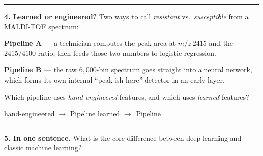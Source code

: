 \documentclass[11pt]{article}
\newif\ifsolution
\newcommand{\blk}[1]{\underline{\hspace{#1}}}
\newcommand{\rb}[2]{\ifsolution\textbf{#1}\else\blk{#2}\fi}
\newcommand{\keybox}[1]{\ifsolution\par\vspace{2pt}%
  \fbox{\parbox{0.965\textwidth}{\small\textbf{Answer.}\; #1}}\par\fi}
\newcommand{\work}[1]{\ifsolution\else\vspace{#1}\fi}
\begin{document}
\work{0.7cm}

\keybox{Row 1: $(1)(2)+(0)(1)+(2)(0) = 2$. \ Row 2: $(-1)(2)+(3)(1)+(1)(0) = 1$. \ Hence
$\mathbf{W}\mathbf{x} = \left(\begin{smallmatrix}2\\1\end{smallmatrix}\right)$. A $2\times3$
matrix times a length-$3$ vector yields a length-$2$ output --- one number per neuron: a full
forward pass.}

\vspace{2pt}\hrule\vspace{5pt}

\textbf{4. Learned or engineered?}\; {\small Two ways to call \emph{resistant} vs.\
\emph{susceptible} from a MALDI-TOF spectrum:}

\vspace{2pt}
\textbf{Pipeline A} --- a technician computes the peak area at $m/z\ 2415$ and the $2415/4100$
ratio, then feeds those two numbers to logistic regression.

\textbf{Pipeline B} --- the raw $6{,}000$-bin spectrum goes straight into a neural network,
which forms its own internal ``peak-ish here'' detector in an early layer.

\vspace{3pt}
Which pipeline uses \emph{hand-engineered} features, and which uses \emph{learned} features?

\vspace{3pt}
hand-engineered $\rightarrow$ Pipeline \rb{A}{1.6cm}
\hfill
learned $\rightarrow$ Pipeline \rb{B}{1.6cm}
\hspace*{2cm}

\keybox{Hand-engineered $\rightarrow$ A; learned $\rightarrow$ B. In A a human chose the peak
area and the ratio (hand-engineered features); in B the network discovers its own ``peak-ish''
detector directly from the raw spectrum (learned features). That shift is the essence of deep
learning.}

\vspace{2pt}\hrule\vspace{5pt}

\textbf{5. In one sentence.}\; {\small What is the core difference between deep learning and
classic machine learning?}

\work{1.4cm}
\ifsolution\else\blk{\linewidth}\\[10pt]\blk{\linewidth}\fi
\end{document}
